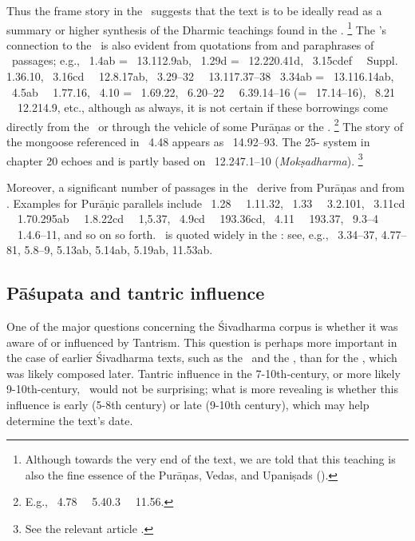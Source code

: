 \noindent
Thus the frame story in the \VSS\ suggests
that the text is to be ideally read as a summary 
or higher synthesis of the Dharmic teachings found
in the \MBH.%
        \footnote{Although towards the very end of the text,
                we are told that this teaching is also the 
                fine essence of the Purāṇas, Vedas, and Upaniṣads
                ().}
The \VSS's connection to the \MBH\
is also evident from quotations from and paraphrases
of \MBH\ passages; e.g., 
\VSS\ 1.4ab = \MBH\ 13.112.9ab, 
\VSS\ 1.29d = \MBH\ 12.220.41d,
\VSS\ 3.15cdef \similar\ \MBH\ Suppl. 1.36.10,
\VSS\ 3.16cd \similar\ \MBH\ 12.8.17ab,
\VSS\ 3.29--32 \similar\ \MBH\ 13.117.37--38
\VSS\ 3.34ab = \MBH\ 13.116.14ab,
\VSS\ 4.5ab \similar\ \MBH\ 1.77.16,
\VSS\ 4.10 = \MBH\ 1.69.22, 
\VSS\ 6.20--22 \similar\ \MBH\ 6.39.14--16 (= \BHG\ 17.14--16), 
\VSS\ 8.21 \similar\ \MBH\ 12.214.9, 
etc., although as always, it is not certain if these borrowings come
directly from the \MBH\ or through the vehicle of
some Purāṇas or the \Manava.%
                \footnote{E.g., \VSS\ 4.78 \similar\ \MBH\ 5.40.3 \similar\ \Manu\ 11.56.}
The story of the mongoose referenced in \VSS\ 4.48 appears as \MBH\ 14.92--93.
The 25-\skt{tattva} system in chapter 20
echoes and is partly based on \MBH\ 12.247.1--10 (\textit{Mokṣadharma}).%
        \footnote{See the relevant article .}
	
Moreover, a significant number of passages in 
the \VSS\ derive from Purāṇas and from \Manu. 
Examples for Purāṇic parallels include 
\VSS\ 1.28 \similar\ \KURMP\ 1.11.32,
\VSS\ 1.33 \similar\ \BRAHMANDAPUR\ 3.2.101,
\VSS\ 3.11cd \similar\ \LINPU\ 1.70.295ab \similar\
                       \KURMP\ 1.8.22cd   \similar\ 
                       \LINPU\ 1,5.37, 
\VSS\ 4.9cd \similar\ \VARP\ 193.36cd,
\VSS\ 4.11 \similar\ \VARP\ 193.37,
\VSS\ 9.3--4 \similar\ \BRAHMANDAPUR\ 1.4.6--11,
and so on so forth.
\Manu\ is quoted widely in the \VSS:
see, e.g., \VSS\ 3.34--37, 4.77--81, 5.8--9, 5.13ab, 5.14ab, 5.19ab, 11.53ab.




\subsection{Pāśupata and tantric influence}
One of the major questions concerning the Śivadharma corpus is whether it was aware of or influenced by Tantrism. This question is perhaps more important in the case of earlier Śivadharma texts, such as the \SDhS\ and the \SDhU, than for the \VSS, which was likely composed later. Tantric influence in the 7-10th-century, or more likely 9-10th-century, \VSS\ would not be surprising; what is more revealing is whether this influence is early (5-8th century) or late (9-10th century), which may help determine the text's date.

